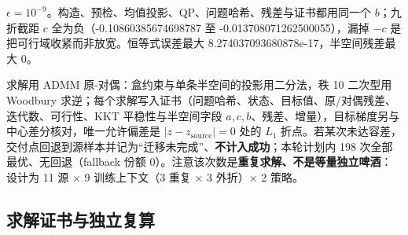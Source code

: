 \documentclass[11pt,a4paper]{article}
\begin{document}
\(\epsilon=10^{-9}\)。构造、预检、均值投影、QP、问题哈希、残差与证书都用同一个
\(b\)；九折截距 \(c\) 全为负（-0.10860385674698787 至
-0.013708071262500055），漏掉 \(-c\)
是把可行域收紧而非放宽。恒等式误差最大
8.274037093680878e-17，半空间残差最大 0。

求解用 ADMM 原-对偶：盒约束与单条半空间的投影用二分法，秩 10 二次型用
Woodbury
求逆；每个求解写入证书（问题哈希、状态、目标值、原/对偶残差、迭代数、可行性、KKT
平稳性与半空间字段
\(a,c,b\)、残差、增量），目标梯度另与中心差分核对，唯一允许偏差是
\(|z-z_{\mathrm{source}}|=0\) 处的 \(L_1\)
折点。若某次未达容差，交付点回退到源样本并记为``迁移未完成''、\textbf{不计入成功}；本轮计划内
198 次全部最优、无回退（fallback 份额
0）。注意该次数是\textbf{重复求解、不是等量独立啤酒}：设计为 11 源 × 9
训练上下文（3 重复 × 3 外折）× 2 策略。

\subsection{求解证书与独立复算}\label{ux6c42ux89e3ux8bc1ux4e66ux4e0eux72ecux7acbux590dux7b97}
\end{document}
